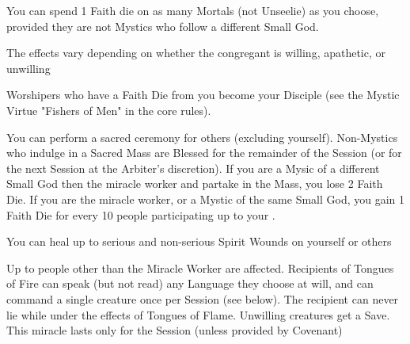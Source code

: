 {You can spend 1 Faith die on as many Mortals (not Unseelie) as you choose, provided they are not Mystics who follow a different Small God.

The effects vary depending on whether the congregant is willing, apathetic, or unwilling


Worshipers who have a Faith Die from you become your Disciple (see the Mystic Virtue "Fishers of Men" in the core rules).


You can perform a sacred ceremony for \SUMDICE others (excluding yourself).  Non-Mystics who indulge in a Sacred Mass are Blessed for the remainder of the Session (or for the next Session at the Arbiter's discretion).  If you are a Mysic of a different Small God then the miracle worker and partake in the Mass, you lose 2 Faith Die.  If you are the miracle worker, or a Mystic of the same Small God, you gain 1 Faith Die for every 10 people participating up to your \MAX.



You can heal up to \DICE serious and non-serious Spirit Wounds on yourself or others


Up to \SUMDICE people other than the Miracle Worker are affected.  Recipients of Tongues of Fire can speak (but not read) any Language they choose at will, and can command a single creature once per Session (see below).  The recipient can never lie while under the effects of Tongues of Flame.  Unwilling creatures get a Save.  This miracle lasts only for the Session (unless provided by Covenant)


\LITURGY [
  Name= Command,
  Link=miracle-command,
  Paradigm=Mind,
  Save=Y,
  Duration=0 ,
  Counter= n/a  ,
  Keywords=None ,
  Target=Nearby creature
]

}
